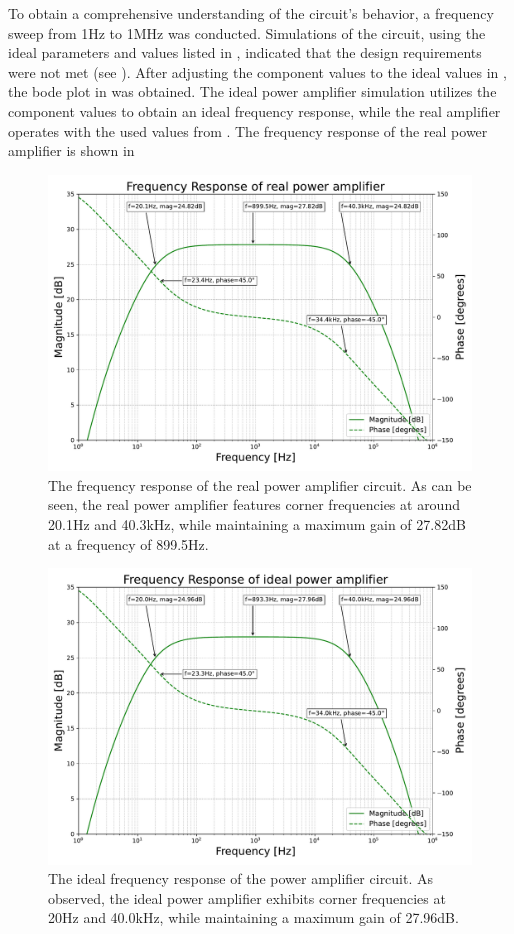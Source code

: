To obtain a comprehensive understanding of the circuit's behavior, a frequency sweep from 1Hz to 1MHz was conducted. Simulations of the circuit, using the ideal parameters and values listed in , indicated that the design requirements were not met (see ). After adjusting the component values to the ideal values in , the bode plot in  was obtained. The ideal power amplifier simulation utilizes the component values to obtain an ideal frequency response, while the real amplifier operates with the used values from . The frequency response of the real power amplifier is shown in 
\begin{figure}[H]
  \centering
    \includegraphics[width=0.75\linewidth]{TU Delft Booming Bass Project Report/figures/PowerAmplifier/real power amplifier results.pdf}
    \captionsetup{justification=raggedright, labelfont=bf}
    \caption{The frequency response of the real power amplifier circuit. As can be seen, the real power amplifier features corner frequencies at around 20.1Hz and 40.3kHz, while maintaining a maximum gain of 27.82dB at a frequency of 899.5Hz.}
    \label{fig:real circuit results}
\end{figure}
\begin{figure}[H]
    \centering
    \includegraphics[width=0.75\linewidth]{TU Delft Booming Bass Project Report/figures/PowerAmplifier/ideal power amplifier results.pdf}
    \caption{The ideal frequency response of the power amplifier circuit. As observed, the ideal power amplifier exhibits corner frequencies at 20Hz and 40.0kHz, while maintaining a maximum gain of 27.96dB.}
    \label{fig: ideal amp results}
\end{figure}



